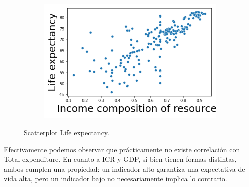 \begin{itemize}
\begin{figure}[H]
\begin{subfigure}{0.3\linewidth}
              \end{subfigure}
              \hfill
                \begin{subfigure}{0.3\linewidth}
                \centering
                \includegraphics[width=\textwidth]{img/21.png}
              \end{subfigure}
               \caption{Scatterplot Life expectancy.}
               	
               \label{fig: 9}
        \end{figure}
  
    \end{itemize}
    
  Efectivamente podemos observar que prácticamente no existe correlación con Total expenditure. En cuanto a ICR y GDP, si bien tienen formas distintas, ambos cumplen una propiedad: un indicador alto garantiza una expectativa de vida alta, pero un indicador bajo no necesariamente implica lo contrario.  
  
